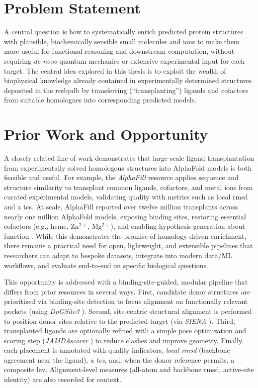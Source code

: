 \section{Problem Statement}
A central question is how to systematically enrich predicted protein structures with plausible, biochemically sensible small molecules and ions to make them more useful for functional reasoning and downstream computation, without requiring \emph{de novo} quantum mechanics or extensive experimental input for each target. The central idea explored in this thesis is to exploit the wealth of biophysical knowledge already contained in experimentally determined structures deposited in the \gls{rcsbpdb} \cite{burleyRCSBProteinData2019} by transferring (``transplanting'') ligands and cofactors from suitable homologues into corresponding predicted models.

\section{Prior Work and Opportunity}
A closely related line of work demonstrates that large-scale ligand transplantation from experimentally solved homologous structures into AlphaFold models is both feasible and useful. For example, the \textit{AlphaFill} resource applies sequence and structure similarity to transplant common ligands, cofactors, and metal ions from curated experimental models, validating quality with metrics such as local \gls{rmsd} and a \gls{tcs}. At scale, AlphaFill reported over twelve million transplants across nearly one million AlphaFold models, exposing binding sites, restoring essential cofactors (e.g., heme, Zn$^{2+}$, Mg$^{2+}$), and enabling hypothesis generation about function \cite{hekkelmanAlphaFillEnrichingAlphaFold2023}. While this demonstrates the promise of homology-driven enrichment, there remains a practical need for open, lightweight, and extensible pipelines that researchers can adapt to bespoke datasets, integrate into modern data/ML workflows, and evaluate end-to-end on specific biological questions.

This opportunity is addressed with a binding-site-guided, modular pipeline that differs from prior resources in several ways. First, candidate donor structures are prioritized via binding-site detection to focus alignment on functionally relevant pockets (using \emph{DoGSite3} \cite{graefBindingSiteDetection2023}). Second, site-centric structural alignment is performed to position donor sites relative to the predicted target (via \emph{SIENA} \cite{bietzSIENAEfficientCompilation2016}). Third, transplanted ligands are optionally refined with a simple pose optimization and scoring step (\emph{JAMDAscorer} \cite{flachsenbergConsistentSchemeGradientBased2020}) to reduce clashes and improve geometry. Finally, each placement is annotated with quality indicators, \emph{local \gls{rmsd}} (backbone agreement near the ligand), a \emph{\gls{tcs}}, and, when the donor reference permits, a composite \gls{lev}. Alignment-level measures (all-atom and backbone \gls{rmsd}, active-site identity) are also recorded for context.

